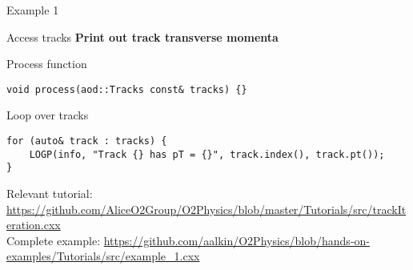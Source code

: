 \documentclass[10pt,lualatex,xcolor={table,svgnames},{hyperref={bookmarks=true,linktoc=all}},aspectratio=169]{beamer}
\begin{document}
\begin{frame}[fragile]{Example 1}
\begin{block}{Access tracks}
\textbf{Print out track transverse momenta}
\end{block}
\begin{block}{Process function}
    \begin{verbatim}
void process(aod::Tracks const& tracks) {}
    \end{verbatim}
\end{block}
\begin{block}{Loop over tracks}
\begin{verbatim}
for (auto& track : tracks) {
    LOGP(info, "Track {} has pT = {}", track.index(), track.pt());
}
\end{verbatim}
\end{block}
{\footnotesize Relevant tutorial:  \href{https://github.com/AliceO2Group/O2Physics/blob/master/Tutorials/src/trackIteration.cxx}{https://github.com/AliceO2Group/O2Physics/blob/master/Tutorials/src/trackIteration.cxx} \\
Complete example: \href{https://github.com/aalkin/O2Physics/blob/hands-on-examples/Tutorials/src/example_1.cxx}{https://github.com/aalkin/O2Physics/blob/hands-on-examples/Tutorials/src/example\_1.cxx}
}
\end{frame}
\end{document}
